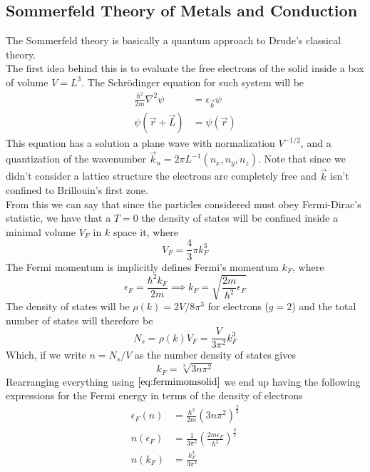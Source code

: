 \documentclass[../qm.tex]{subfiles}
\begin{document}
\subsection{Sommerfeld Theory of Metals and Conduction}
The Sommerfeld theory is basically a quantum approach to Drude's classical theory.\\
The first idea behind this is to evaluate the free electrons of the solid inside a box of volume $V=L^3$. The Schrödinger equation for such system will be
\begin{equation}
	\begin{aligned}
		\frac{\hbar^2}{2m}\nabla^2\psi&=\epsilon_{\vec{k}}\psi\\
		\psi(\vec{r}+\vec{L})&=\psi(\vec{r})
	\end{aligned}
	\label{eq:sommerfeldfreeel}
\end{equation}
This equation has a solution a plane wave with normalization $V^{-1/2}$, and a quantization of the wavenumber $\vec{k}_n=2\pi L^{-1}(n_x,n_y,n_z)$. Note that since we didn't consider a lattice structure the electrons are completely free and $\vec{k}$ isn't confined to Brillouin's first zone.\\
From this we can say that since the particles considered must obey Fermi-Dirac's statistic, we have that a $T=0$ the density of states will be confined inside a minimal volume $V_F$ in $k$ space it, where
\begin{equation*}
	V_F=\frac{4}{3}\pi k_F^3
\end{equation*}
The Fermi momentum is implicitly defines Fermi's momentum $k_F$, where
\begin{equation*}
	\epsilon_F=\frac{\hbar^2k_F}{2m}\implies k_F=\sqrt{\frac{2m}{\hbar^2}\epsilon_F}
\end{equation*}
The density of states will be $\rho(k)=2V/8\pi^3$ for electrons ($g=2$) and the total number of states will therefore be
\begin{equation*}
	N_s=\rho(k)V_F=\frac{V}{3\pi^2}k_F^3
\end{equation*}
Which, if we write $n=N_s/V$ as the number density of states gives
\begin{equation}
	k_F=\sqrt[3]{3n\pi^2}
	\label{eq:fermimomsolid}
\end{equation}
Rearranging everything using $\eqref{eq:fermimomsolid}$ we end up having the following expressions for the Fermi energy in terms of the density of electrons
\begin{equation}
	\begin{aligned}
		\epsilon_F(n)&=\frac{\hbar^2}{2m}(3n\pi^2)^{\frac{2}{3}}\\
		n(\epsilon_F)&=\frac{1}{3\pi^2}\left( \frac{2m\epsilon_F}{\hbar^2} \right)^{\frac{3}{2}}\\
		n(k_F)&=\frac{k_F^3}{3\pi^2}
	\end{aligned}
	\label{eq:densityelectronssomm}
\end{equation}
\end{document}

